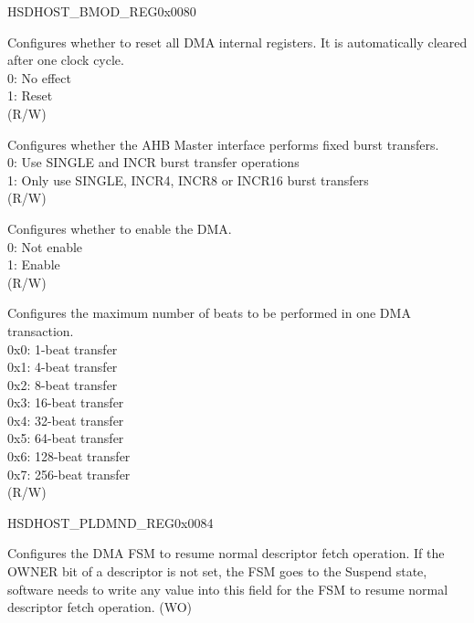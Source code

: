 \begin{register}{H}{SDHOST\_BMOD\_REG}{0x0080}\label{regdesc:SDHOSTBMODREG}
%
%
%
%
%
%
\regnewline%
\begin{regdesc}\begin{reglist}
\label{fielddesc:SDHOSTBMODSWR}\item [SDHOST\_BMOD\_SWR] Configures whether to reset all DMA internal registers. It is automatically cleared after one clock cycle.\\
0: No effect\\1: Reset\\(R/W)
\label{fielddesc:SDHOSTBMODFB}\item [SDHOST\_BMOD\_FB] Configures whether the AHB Master interface performs fixed burst transfers.\\
0: Use SINGLE and INCR burst transfer operations\\
1: Only use SINGLE, INCR4, INCR8 or INCR16 burst transfers\\(R/W)
\label{fielddesc:SDHOSTBMODDE}\item [SDHOST\_BMOD\_DE] Configures whether to enable the DMA.\\
0: Not enable\\
1: Enable\\(R/W)
\label{fielddesc:SDHOSTBMODPBL}\item [SDHOST\_BMOD\_PBL] Configures the maximum number of beats to be performed in one DMA transaction.\\
0x0: 1-beat transfer\\
0x1: 4-beat transfer\\
0x2: 8-beat transfer\\
0x3: 16-beat transfer\\
0x4: 32-beat transfer\\
0x5: 64-beat transfer\\
0x6: 128-beat transfer\\
0x7: 256-beat transfer\\
(R/W)
\end{reglist}\end{regdesc}
\end{register}


\begin{register}{H}{SDHOST\_PLDMND\_REG}{0x0084}\label{regdesc:SDHOSTPLDMNDREG}
%
\regnewline%
\begin{regdesc}\begin{reglist}
\label{fielddesc:SDHOSTPLDMNDPD}\item [SDHOST\_PLDMND\_PD] Configures the DMA FSM to resume normal descriptor fetch operation. If the OWNER bit of a descriptor is not set, the FSM goes to the Suspend state, software needs to write any value into this field for the FSM to resume normal descriptor fetch operation. (WO)
\end{reglist}\end{regdesc}
\end{register}


